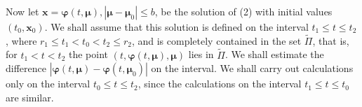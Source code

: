 \documentclass[10pt,a5paper]{book}
\makeatletter
\theoremstyle{plain}
\theoremstyle{definition}
\theoremstyle{remark}
\renewenvironment{proof}[1][\proofname]{\par
  \pushQED{\qed}%
  \normalfont\topsep6\p@\@plus6\p@\relax
  \trivlist
  \item\relax{\itshape #1\@addpunct{.}}\hspace\labelsep\ignorespaces
}{\popQED\endtrivlist\@endpefalse}
\makeatother
\begin{document}
\begin{proof}
Now let $\mathbf{x}=\boldsymbol{\varphi}(t, \boldsymbol{\mu}),\left|\boldsymbol{\mu}-\boldsymbol{\mu}_{0}\right| \leq b$, be the solution of (2) with initial values $\left(t_{0}, \mathbf{x}_{0}\right)$. We shall assume that this solution is defined on the interval $t_{1} \leq t \leq t_{2}$, where $r_{1} \leq t_{1}<t_{0}<t_{2} \leq r_{2}$, and is completely contained in the set $\widetilde{\Pi}$, that is, for $t_{1}<t<t_{2}$ the point $(t, \boldsymbol{\varphi}(t, \boldsymbol{\mu}), \boldsymbol{\mu})$ lies in $\widetilde{\Pi}$. We shall estimate the difference $\left|\boldsymbol{\varphi}(t, \boldsymbol{\mu})-\boldsymbol{\varphi}\left(t, \boldsymbol{\mu}_{0}\right)\right|$ on the interval. We shall carry out calculations only on the interval $t_{0} \leq t \leq t_{2}$, since the calculations on the interval $t_{1} \leq t \leq t_{0}$ are similar.


\end{proof}
\end{document}
